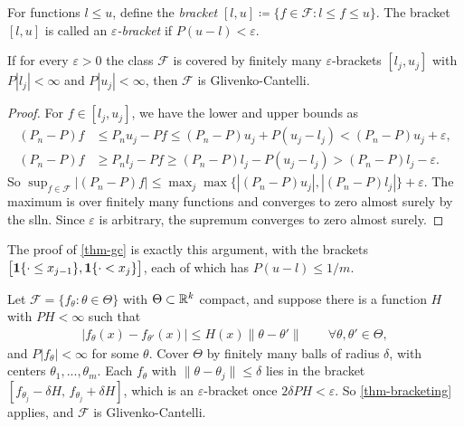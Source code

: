 \documentclass[a4paper,12pt]{article}
\begin{document}
\begin{definition}[Bracket]
	For functions $l\le u$, define the \emph{bracket} $[l,u]\coloneqq\{f\in\mathcal{F}:l\le f\le u\}$.
	The bracket $[l,u]$ is called an \emph{$\varepsilon$-bracket} if $P(u-l)<\varepsilon$.
\end{definition}

\begin{theorem}\label{thm-bracketing}
	If for every $\varepsilon>0$ the class $\mathcal F$ is covered by finitely many $\varepsilon$-brackets $[l_j,u_j]$
	with $P|l_j|<\infty$ and $P|u_j|<\infty$, then $\mathcal F$ is Glivenko-Cantelli.
\end{theorem}
\begin{proof}
	For $f\in[l_j,u_j]$, we have the lower and upper bounds as
	\begin{align*}
		(P_n-P)f &\le P_nu_j-Pf\le(P_n-P)u_j+P(u_j-l_j)<(P_n-P)u_j+\varepsilon, \\
		(P_n-P)f &\ge P_nl_j-Pf\ge(P_n-P)l_j-P(u_j-l_j)>(P_n-P)l_j-\varepsilon.
	\end{align*}
	So $\sup_{f\in\mathcal F}|(P_n-P)f|\le\max_j\max\{|(P_n-P)u_j|,|(P_n-P)l_j|\}+\varepsilon$.
	The maximum is over finitely many functions and converges to zero almost surely by the \gls{slln}.
	Since $\varepsilon$ is arbitrary, the supremum converges to zero almost surely.
\end{proof}

\begin{remark}
	The proof of \autoref{thm-gc} is exactly this argument,
	with the brackets $\bigl[\mathbf{1}\{\cdot\le x_{j-1}\},\mathbf{1}\{\cdot<x_j\}\bigr]$, each of which has $P(u-l)\le1/m$.
\end{remark}

\begin{example}\label{ex-lipschitz}
	Let $\mathcal F=\{f_\theta:\theta\in\Theta\}$ with $\Theta\subset\mathbb{R}^k$ compact,
	and suppose there is a function $H$ with $PH<\infty$ such that
	\begin{align}
		|f_\theta(x)-f_{\theta'}(x)|\le H(x)\|\theta-\theta'\|
		\qquad\forall\theta,\theta'\in\Theta,
	\end{align}
	and $P|f_{\theta}|<\infty$ for some $\theta$.
	Cover $\Theta$ by finitely many balls of radius $\delta$, with centers $\theta_1,...,\theta_m$.
	Each $f_\theta$ with $\|\theta-\theta_j\|\le\delta$ lies in the bracket $[f_{\theta_j}-\delta H,\,f_{\theta_j}+\delta H]$,
	which is an $\varepsilon$-bracket once $2\delta PH<\varepsilon$.
	So \autoref{thm-bracketing} applies, and $\mathcal F$ is Glivenko-Cantelli.
\end{example}
\end{document}
